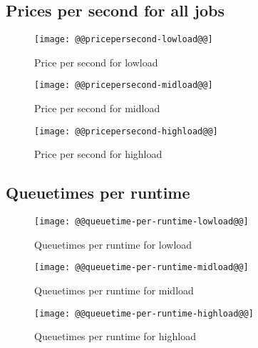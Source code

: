 \documentclass[11pt]{article}
\begin{document}
\newpage
\subsection{Prices per second for all jobs}
\begin{figure}[htbp]
  \begin{center}
    \texttt{[image: @@pricepersecond-lowload@@]}
    \caption{Price per second for lowload}
    \label{fig:pricepersecond-lowload}
  \end{center}
\end{figure}
\begin{figure}[htbp]
  \begin{center}
    \texttt{[image: @@pricepersecond-midload@@]}
    \caption{Price per second for midload}
    \label{fig:pricepersecond-midload}
  \end{center}
\end{figure}
\begin{figure}[htbp]
  \begin{center}
    \texttt{[image: @@pricepersecond-highload@@]}
    \caption{Price per second for highload}
    \label{fig:pricepersecond-highload}
  \end{center}
\end{figure}


\newpage
\subsection{Queuetimes per runtime}
\begin{figure}[htbp]
  \begin{center}
    \texttt{[image: @@queuetime-per-runtime-lowload@@]}
    \caption{Queuetimes per runtime for lowload}
    \label{fig:queuetime-per-runtime-lowload}
  \end{center}
\end{figure}
\begin{figure}[htbp]
  \begin{center}
    \texttt{[image: @@queuetime-per-runtime-midload@@]}
    \caption{Queuetimes per runtime for midload}
    \label{fig:queuetime-per-runtime-midload}
  \end{center}
\end{figure}
\begin{figure}[htbp]
  \begin{center}
    \texttt{[image: @@queuetime-per-runtime-highload@@]}
    \caption{Queuetimes per runtime for highload}
    \label{fig:queuetime-per-runtime-highload}
  \end{center}
\end{figure}
\end{document}
